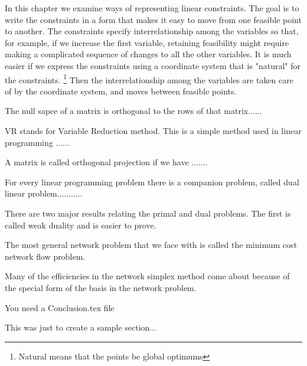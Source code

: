 \documentclass{iitthesis}
\begin{document}
In this chapter we examine ways of representing linear
constraints. The goal is to write the constraints in a form that
makes it easy to move from one feasible point to another. The
constraints specify interrelationship among the variables so that,
for example, if we increase the first variable, retaining
feasibility might require making a complicated sequence of changes
to all the other variables. It is much easier if we express the
constraints using a coordinate system that is "natural" for the
constraints. \footnote{Natural means that the points be global
optimums} Then the interrelationship among the variables are taken
care of by the coordinate system, and moves between feasible
points.


The null sapce of a matrix is orthogonal to the rows of that
matrix......


VR stands for Variable Reduction method. This is a simple method
used in linear programming ......


A matrix is called orthogonal projection if we have .......



For every linear programming problem there is a companion problem,
called dual linear problem...........


There are two major results relating the primal and dual problems.
The first is called weak duality and is easier to prove.



The most general network problem that we face with is called  the
minimum cost network flow problem.

 Many of the efficiencies in the
network simplex method come about because of the special form of
the basis in the network problem.


 You need a Conclusion.tex file



This was just to create a sample section...
\end{document}
